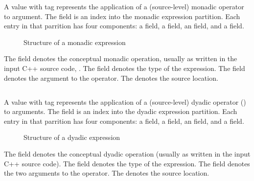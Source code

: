 A  value with tag  represents the application of a (source-level) monadic operator to argument.
The  field is an index into the monadic expression partition.
Each entry in that parrition has four components: a  field, a  field, an  field, and a  field.
%
\begin{figure}[H]
	\centering
	\caption{Structure of a monadic expression}
	\label{fig:ifc-monadic-expression-structure}
\end{figure}
%
The  field denotes the conceptual monadic operation, usually as written in the input C++ source code, .
The  field denotes the type of the expression.
The  field denotes the argument to the operator.
The  denotes the source location.



\subsection{}
\label{sec:ifc:ExprSort:Dyad}

A  value with tag  represents the application of a (source-level) dyadic operator () to arguments.
The  field is an index into the dyadic expression partition.
Each entry in that parrition has four components: a  field, a  field, an  field, and a  field.
%
\begin{figure}[H]
	\centering
	\caption{Structure of a dyadic expression}
	\label{fig:ifc-dyadic-expression-structure}
\end{figure}
%
The  field denotes the conceptual dyadic operation (usually as written in the input C++ source code).
The  field denotes the type of the expression.
The  field denotes the two arguments to the operator.
The  denotes the source location.

